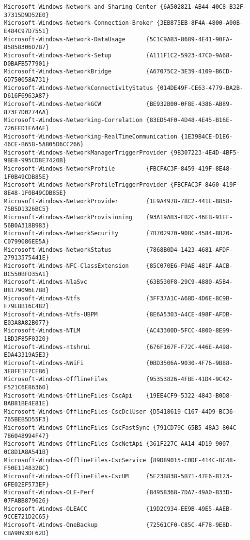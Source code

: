 \documentclass{report}
\begin{document}
\begin{lstlisting}[breaklines=true,basicstyle=\tiny]
Microsoft-Windows-Network-and-Sharing-Center {6A502821-AB44-40C8-B32F-37315D9D52E0}
Microsoft-Windows-Network-Connection-Broker {3EB875EB-8F4A-4800-A00B-E484C97D7551}
Microsoft-Windows-Network-DataUsage      {5C1C9AB3-8689-4E41-90FA-85858306D7B7}
Microsoft-Windows-Network-Setup          {A111F1C2-5923-47C0-9A68-D0BAFB577901}
Microsoft-Windows-NetworkBridge          {A67075C2-3E39-4109-B6CD-6D750058A731}
Microsoft-Windows-NetworkConnectivityStatus {014DE49F-CE63-4779-BA2B-D616F6963A87}
Microsoft-Windows-NetworkGCW             {BE932B00-0F8E-4386-AB89-873F7D0274AA}
Microsoft-Windows-Networking-Correlation {83ED54F0-4D48-4E45-B16E-726FFD1FA4AF}
Microsoft-Windows-Networking-RealTimeCommunication {1E39B4CE-D1E6-46CE-B65B-5AB05D6CC266}
Microsoft-Windows-NetworkManagerTriggerProvider {9B307223-4E4D-4BF5-9BE8-995CD8E7420B}
Microsoft-Windows-NetworkProfile         {FBCFAC3F-8459-419F-8E48-1F0B49CDB85E}
Microsoft-Windows-NetworkProfileTriggerProvider {FBCFAC3F-8460-419F-8E48-1F0B49CDB85E}
Microsoft-Windows-NetworkProvider        {1E9A4978-78C2-441E-8858-75B5D1326BC5}
Microsoft-Windows-NetworkProvisioning    {93A19AB3-FB2C-46EB-91EF-56B0A318B983}
Microsoft-Windows-NetworkSecurity        {7B702970-90BC-4584-8B20-C0799086EE5A}
Microsoft-Windows-NetworkStatus          {7868B0D4-1423-4681-AFDF-27913575441E}
Microsoft-Windows-NFC-ClassExtension     {85C070E6-F9AE-481F-AACB-BC550BFD35A1}
Microsoft-Windows-NlaSvc                 {63B530F8-29C9-4880-A5B4-B8179096E7B8}
Microsoft-Windows-Ntfs                   {3FF37A1C-A68D-4D6E-8C9B-F79E8B16C482}
Microsoft-Windows-Ntfs-UBPM              {8E6A5303-A4CE-498F-AFDB-E03A8A82B077}
Microsoft-Windows-NTLM                   {AC43300D-5FCC-4800-8E99-1BD3F85F0320}
Microsoft-Windows-ntshrui                {676F167F-F72C-446E-A498-EDA43319A5E3}
Microsoft-Windows-NWiFi                  {0BD3506A-9030-4F76-9B88-3E8FE1F7CFB6}
Microsoft-Windows-OfflineFiles           {95353826-4FBE-41D4-9C42-F521C6E86360}
Microsoft-Windows-OfflineFiles-CscApi    {19EE4CF9-5322-4843-B0D8-BAB81BE4E81E}
Microsoft-Windows-OfflineFiles-CscDclUser {D5418619-C167-44D9-BC36-765BEB5D55F3}
Microsoft-Windows-OfflineFiles-CscFastSync {791CD79C-65B5-48A3-804C-786048994F47}
Microsoft-Windows-OfflineFiles-CscNetApi {361F227C-AA14-4D19-9007-0C8D1A8A541B}
Microsoft-Windows-OfflineFiles-CscService {89D89015-C0DF-414C-BC48-F50E114832BC}
Microsoft-Windows-OfflineFiles-CscUM     {5E23B838-5B71-47E6-B123-6FE02EF573EF}
Microsoft-Windows-OLE-Perf               {84958368-7DA7-49A0-B33D-07FABB879626}
Microsoft-Windows-OLEACC                 {19D2C934-EE9B-49E5-AAEB-9CCE721D2C65}
Microsoft-Windows-OneBackup              {72561CF0-C85C-4F78-9E8D-CBA9093DF62D}

\end{lstlisting}
\end{document}
